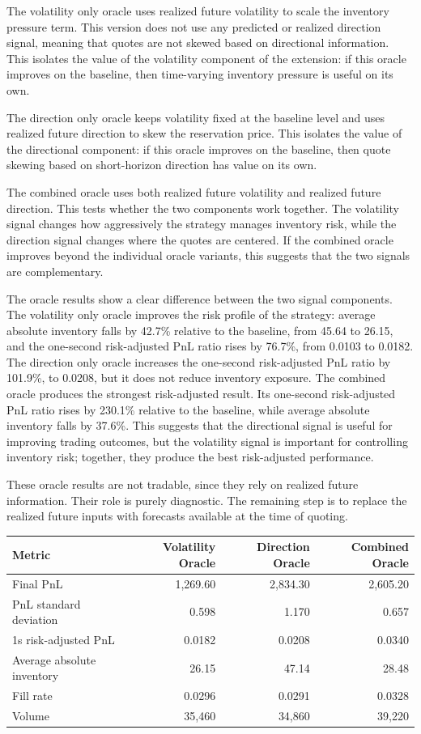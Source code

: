 \documentclass[12pt,a4paper]{article}
\begin{document}
The volatility only oracle uses realized future volatility to scale the
inventory pressure term. This version does not use any predicted or
realized direction signal, meaning that quotes are not skewed based on
directional information. This isolates the value of the volatility
component of the extension: if this oracle improves on the baseline,
then time-varying inventory pressure is useful on its own.

The direction only oracle keeps volatility fixed at the baseline level
and uses realized future direction to skew the reservation price. This
isolates the value of the directional component: if this oracle improves
on the baseline, then quote skewing based on short-horizon direction has
value on its own.

The combined oracle uses both realized future volatility and realized
future direction. This tests whether the two components work together.
The volatility signal changes how aggressively the strategy manages
inventory risk, while the direction signal changes where the quotes are
centered. If the combined oracle improves beyond the individual oracle
variants, this suggests that the two signals are complementary.

The oracle results show a clear difference between the two signal
components. The volatility only oracle improves the risk profile of the
strategy: average absolute inventory falls by 42.7\% relative to the
baseline, from 45.64 to 26.15, and the one-second risk-adjusted PnL
ratio rises by 76.7\%, from 0.0103 to 0.0182. The direction only oracle
increases the one-second risk-adjusted PnL ratio by 101.9\%, to 0.0208,
but it does not reduce inventory exposure. The combined oracle produces
the strongest risk-adjusted result. Its one-second risk-adjusted PnL
ratio rises by 230.1\% relative to the baseline, while average absolute
inventory falls by 37.6\%. This suggests that the directional signal is
useful for improving trading outcomes, but the volatility signal is
important for controlling inventory risk; together, they produce the
best risk-adjusted performance.

These oracle results are not tradable, since they rely on realized
future information. Their role is purely diagnostic. The remaining step
is to replace the realized future inputs with forecasts available at the
time of quoting.

\begingroup\small{}\setlength{\tabcolsep}{4pt}
\begin{longtable}[]{@{}lrrr@{}}
\toprule\noalign{}
Metric & Volatility Oracle & Direction Oracle & Combined Oracle \\
\midrule\noalign{}
\endhead
\bottomrule\noalign{}
\endlastfoot
Final PnL & 1,269.60 & 2,834.30 & 2,605.20 \\
PnL standard deviation & 0.598 & 1.170 & 0.657 \\
1s risk-adjusted PnL & 0.0182 & 0.0208 & 0.0340 \\
Average absolute inventory & 26.15 & 47.14 & 28.48 \\
Fill rate & 0.0296 & 0.0291 & 0.0328 \\
Volume & 35,460 & 34,860 & 39,220 \\
\end{longtable}
\endgroup
\end{document}
